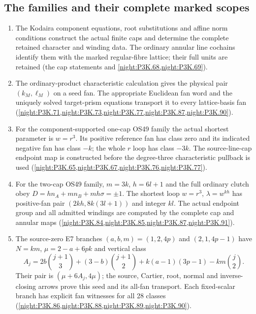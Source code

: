 \subsection{The families and their complete marked scopes}
\RungOne
\begin{enumerate}[label=\arabic*.]
\item The Kodaira component equations, root substitutions and
  affine norm conditions construct the actual finite caps and
  determine the complete retained character and winding data.
  The ordinary annular line cochains identify them with the
  marked regular-fibre lattice; their full units are retained
  (the cap statements and \cref{night:P3K.68,night:P3K.69}).
\item The ordinary-product characteristic calculation gives the
  physical pair $(k_M,\ell_M)$ on a seed fan.  The appropriate
  Euclidean fan word and the uniquely solved target-prism equations
  transport it to every lattice-basis fan
  (\cref{night:P3K.71,night:P3K.73,night:P3K.77,night:P3K.87,night:P3K.90}).
\item For the component-supported one-cap OS49 family the actual
  shortest parameter is $w=r^3$.  Its positive reference fan has
  class zero and its indicated negative fan has class $-k$;
  the whole $r$ loop has class $-3k$.  The source-line-cap endpoint
  map is constructed before the degree-three characteristic
  pullback is used (\cref{night:P3K.65,night:P3K.67,night:P3K.76,night:P3K.77}).
\item For the two-cap OS49 family, $m=3k$, $h=6l+1$ and the full
  ordinary clutch obey
  $D=hn_A+mn_B+mh\sigma=\pm1$.
  The shortest loop $w=r^3$, $\lambda=w^{kh}$ has positive-fan
  pair $(2kh,8k(3l+1))$ and integer $kl$.
  The actual endpoint group and all admitted windings are computed
  by the complete cap and annular maps
  (\cref{night:P3K.84,night:P3K.85,night:P3K.87,night:P3K.91}).
\item The source-zero E7 branches
  $(a,b,m)=(1,2,4p)$ and $(2,1,4p-1)$ have
  $N=km$, $\mu=2-a+6pk$ and vertical class
  \[
  A_j=2b\binom{j+1}{3}+(3-b)\binom{j+1}{2}
      +k(a-1)(3p-1)-km\binom j2.
  \]
  Their pair is $(\mu+6A_j,4\mu)$; the source, Cartier, root,
  normal and inverse-closing arrows prove this seed and its
  all-fan transport.  Each fixed-scalar branch has explicit fan
  witnesses for all 28 classes
  (\cref{night:P3K.86,night:P3K.88,night:P3K.89,night:P3K.90}).
\end{enumerate}


